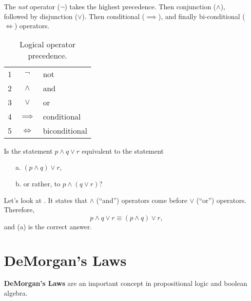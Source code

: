 The \emph{not} operator ($\neg$) takes the highest precedence.
Then conjunction ($\land$), followed by disjunction ($\lor$).
Then conditional ($\implies$), and finally bi-conditional ($\iff$) operators.
\begin{table}[H]
  \centering
    \begin{tabular}{r|cl}
      1 & $\neg$      &not\\
      2 & $\land$     &and \\
      3 & $\lor$      & or \\
      4 & $\implies$  & conditional \\
      5 & $\iff$      &biconditional
    \end{tabular}
  \caption{Logical operator precedence.}
  \label{tab:precedence}
\end{table}
\begin{ex}
    Is the statement $ p \land q \lor r $ equivalent to the statement
    \begin{enumerate}
        \item[a.] $(p \land q ) \lor r$,
        \item[b.] or rather, to $ p \land (q \lor r)$?
    \end{enumerate}
    \begin{sol}
        Let's look at .
        It states that $\land$ (``and'') operators come before $\lor$ (``or'') operators.
        Therefore,
        \[ p \land q \lor r \equiv (p \land q) \lor r,\]
        and (a) is the correct answer.
    \end{sol}
\end{ex}

\section{DeMorgan's Laws}
\textbf{DeMorgan's Laws} are an important concept in propositional logic and boolean algebra.

